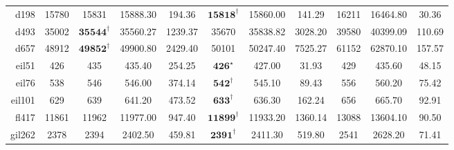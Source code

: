 \documentclass[12pt]{ctexart}
\begin{document}
\begin{table}[htbp]
\begin{tabular}{rcccccccccc}
        d198                          & 15780                             & 15831                       & 15888.30                               & 194.36           & $\textbf{15818}^\dag$   & 15860.00         & 141.29           & 16211                 & 16464.80         & 30.36            \\
        d493                          & 35002                             & $\textbf{35544}^\dag$       & 35560.27                               & 1239.37          & 35670                   & 35838.82         & 3028.20          & 39580                 & 40399.09         & 110.69           \\
        d657                          & 48912                             & $\textbf{49852}^\dag$       & 49900.80                               & 2429.40          & 50101                   & 50247.40         & 7525.27          & 61152                 & 62870.10         & 157.57           \\
        eil51                         & 426                               & 435                         & 435.40                                 & 254.25           & $\textbf{426}^\star$    & 427.00           & 31.93            & 429                   & 435.60           & 48.15            \\
        eil76                         & 538                               & 546                         & 546.00                                 & 374.14           & $\textbf{542}^\dag$     & 545.10           & 89.43            & 556                   & 560.20           & 75.42            \\
        eil101                        & 629                               & 639                         & 641.20                                 & 473.52           & $\textbf{633}^\dag$     & 636.30           & 162.24           & 656                   & 665.70           & 92.91            \\
        fl417                         & 11861                             & 11962                       & 11977.00                               & 947.40           & $\textbf{11899}^\dag$   & 11933.20         & 1360.14          & 13088                 & 13604.10         & 90.50            \\
        gil262                        & 2378                              & 2394                        & 2402.50                                & 459.81           & $\textbf{2391}^\dag$    & 2411.30          & 519.80           & 2541                  & 2628.20          & 71.41            \\

\end{tabular}
\end{table}
\end{document}
